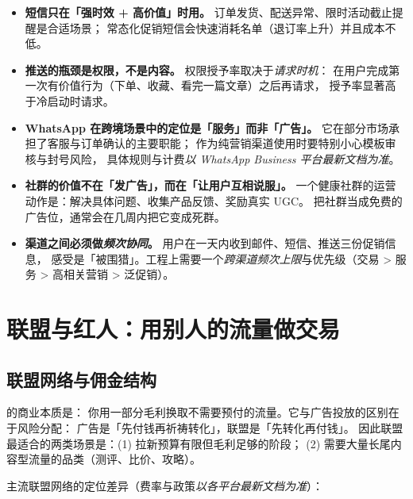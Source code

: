 \begin{itemize}
  \item \textbf{短信只在「强时效 + 高价值」时用。}
        订单发货、配送异常、限时活动截止提醒是合适场景；
        常态化促销短信会快速消耗名单（退订率上升）并且成本不低。
  \item \textbf{推送的瓶颈是权限，不是内容。} 权限授予率取决于\emph{请求时机}：
        在用户完成第一次有价值行为（下单、收藏、看完一篇文章）之后再请求，
        授予率显著高于冷启动时请求。
  \item \textbf{WhatsApp 在跨境场景中的定位是「服务」而非「广告」。}
        它在部分市场承担了客服与订单确认的主要职能；
        作为纯营销渠道使用时要特别小心模板审核与封号风险，
        具体规则与计费\emph{以 WhatsApp Business 平台最新文档为准}。
  \item \textbf{社群的价值不在「发广告」，而在「让用户互相说服」。}
        一个健康社群的运营动作是：解决具体问题、收集产品反馈、奖励真实 UGC。
        把社群当成免费的广告位，通常会在几周内把它变成死群。
  \item \textbf{渠道之间必须做\emph{频次协同}。} 用户在一天内收到邮件、短信、推送三份促销信息，
        感受是「被围猎」。工程上需要一个\emph{跨渠道频次上限}与优先级（交易 > 服务 > 高相关营销 > 泛促销）。
\end{itemize}

\section{联盟与红人：用别人的流量做交易}
\label{sec:cro-affiliate}

\subsection{联盟网络与佣金结构}

 的商业本质是：
你用一部分毛利换取不需要预付的流量。它与广告投放的区别在于风险分配：
广告是「先付钱再祈祷转化」，联盟是「先转化再付钱」。
因此联盟最适合的两类场景是：(1) 拉新预算有限但毛利足够的阶段；
(2) 需要大量长尾内容型流量的品类（测评、比价、攻略）。

主流联盟网络的定位差异（费率与政策\emph{以各平台最新文档为准}）：

